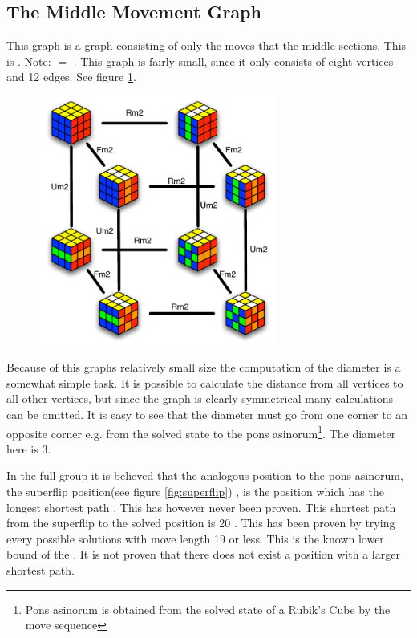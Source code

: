 \subsection{The Middle Movement Graph}
\label{sub:middleMoveGraph}
This graph is a \rubik{} graph consisting of only the moves that \twist{} the middle sections. 
This is . Note:  $=$ .  This graph is fairly small, since it only consists of eight vertices and 12 edges. See figure \ref{fig:graphMiddleSlice2}. \cite[pp. 158-167]{Rubik87}

\begin{figure}[bht!]
	\centering
		\includegraphics[width = 0.7\textwidth]{input/pics/graphMiddleSlice2.pdf}
	\caption{}
	\label{fig:graphMiddleSlice2}
\end{figure}

Because of this graphs relatively small size the computation of the diameter is a somewhat simple task. It is possible to calculate the distance from all vertices to all other vertices, but since the graph is clearly symmetrical many calculations can be omitted. It is easy to see that the diameter must go from one corner to an opposite corner e.g. from the solved state to the pons asinorum\footnote{Pons asinorum is obtained from the solved state of a Rubik's Cube by the move sequence }. The diameter here is 3. 

In the full \rubik{} group it is believed that the analogous position to the pons asinorum, the superflip position(see figure \ref{fig:superflip}) , is the position which has the longest shortest path \cite{speedsolving.wiki}. This has however never been proven. This shortest path from the superflip to the solved position is 20 \cite{rokicki09}. This has been proven by trying every possible solutions with move length 19 or less. This is the known lower bound of the \cube{}. It is not proven that there does not exist a position with a larger shortest path. 

